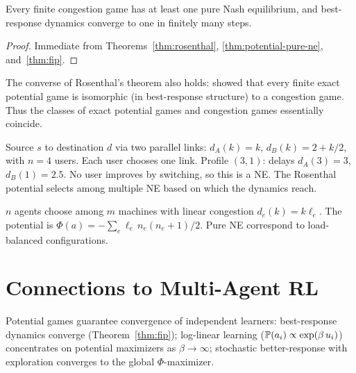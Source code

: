 \documentclass[11pt,a4paper]{article}
\begin{document}
\begin{corollary}
\label{cor:congestion-ne}
Every finite congestion game has at least one pure Nash equilibrium, and
best-response dynamics converge to one in finitely many steps.
\end{corollary}

\begin{proof}
Immediate from Theorems~\ref{thm:rosenthal},
\ref{thm:potential-pure-ne}, and~\ref{thm:fip}.
\end{proof}

\begin{remark}
The converse of Rosenthal's theorem also holds:
\citet{monderer1996} showed that every finite exact potential game is
isomorphic (in best-response structure) to a congestion game. Thus the
classes of exact potential games and congestion games essentially
coincide.
\end{remark}

\begin{example}
\label{ex:routing}
Source $s$ to destination $d$ via two parallel links: $d_A(k) = k$,
$d_B(k) = 2 + k/2$, with $n = 4$ users. Each user chooses one link.
Profile $(3,1)$: delays $d_A(3) = 3$, $d_B(1) = 2.5$. No user
improves by switching, so this is a NE. The Rosenthal potential selects
among multiple NE based on which the dynamics reach.
\end{example}

\begin{example}
\label{ex:resource-alloc}
$n$ agents choose among $m$ machines with linear congestion
$d_e(k) = k\ell_e$. The potential is
$\Phi(a) = -\sum_e\ell_e\,n_e(n_e+1)/2$. Pure NE correspond to
load-balanced configurations.
\end{example}


\section{Connections to Multi-Agent RL}
\label{sec:rl-connections}

\begin{rlconnection}[title={Independent Learners in Potential Games}]
Potential games guarantee convergence of independent learners:
best-response dynamics converge (Theorem~\ref{thm:fip}); log-linear
learning ($\mathbb{P}(a_i) \propto \exp(\beta\,u_i)$) concentrates on
potential maximizers as $\beta \to \infty$; stochastic better-response
with exploration converges to the global $\Phi$-maximizer.
\end{rlconnection}
\end{document}
